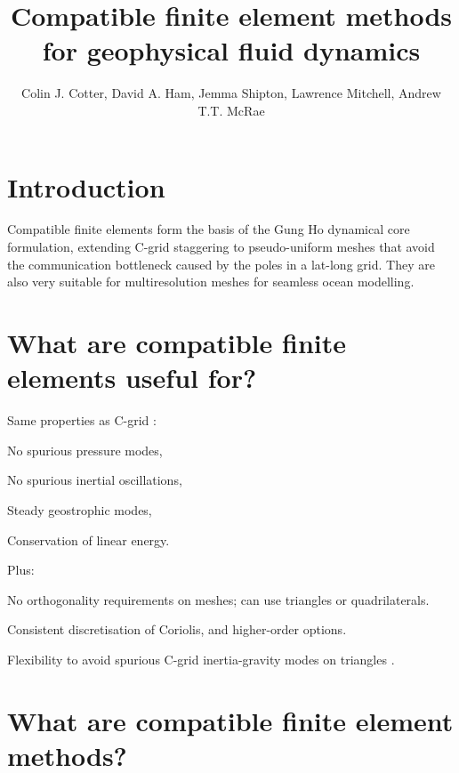 \documentclass[landscape]{imposter}
\title{Compatible finite element methods for geophysical fluid dynamics}
\author{Colin J. Cotter, David A. Ham, Jemma Shipton, Lawrence Mitchell, Andrew T.T. McRae}
\newenvironment{packed_enum}{
\begin{enumerate}
  \setlength{\itemsep}{1pt}
  \setlength{\parskip}{0pt}
  \setlength{\parsep}{0pt}
}{\end{enumerate}}
\begin{document}
\begin{multicols*}{3}
\section{Introduction}
Compatible finite elements form the basis of the Gung Ho dynamical
core formulation, extending C-grid staggering to pseudo-uniform meshes
that avoid the communication bottleneck caused by the poles in
a lat-long grid. They are also very suitable for
multiresolution meshes for seamless ocean modelling.

\section{What are compatible finite elements useful for?}
Same properties as C-grid \cite{cotter2012mixed}:
\vspace{-1cm}
\begin{multicols}{2}
\begin{packed_enum}
\item No spurious pressure modes,
\item No spurious inertial oscillations,
\item Steady geostrophic modes,
\item Conservation of linear energy.
\end{packed_enum}
\end{multicols}
\vspace{-0.5cm}
Plus:
\begin{packed_enum}
\item No orthogonality requirements on meshes; can use triangles or
  quadrilaterals.
\item Consistent discretisation of Coriolis, and higher-order options.
\item Flexibility to avoid spurious C-grid inertia-gravity modes on triangles \cite{danilov2010utility}.
\end{packed_enum}
\vspace{-1cm}

\section{What are compatible finite element methods?}


\end{multicols*}
\end{document}
